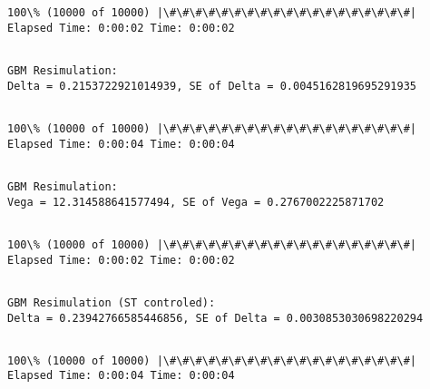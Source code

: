 \documentclass[11pt]{article}
\begin{document}
    \begin{Verbatim}[commandchars=\\\{\}]
100\% (10000 of 10000) |\#\#\#\#\#\#\#\#\#\#\#\#\#\#\#\#\#\#\#| Elapsed Time: 0:00:02 Time: 0:00:02

    \end{Verbatim}

    \begin{Verbatim}[commandchars=\\\{\}]

GBM Resimulation:
Delta = 0.2153722921014939, SE of Delta = 0.0045162819695291935


    \end{Verbatim}

    \begin{Verbatim}[commandchars=\\\{\}]
100\% (10000 of 10000) |\#\#\#\#\#\#\#\#\#\#\#\#\#\#\#\#\#\#\#| Elapsed Time: 0:00:04 Time: 0:00:04

    \end{Verbatim}

    \begin{Verbatim}[commandchars=\\\{\}]

GBM Resimulation:
Vega = 12.314588641577494, SE of Vega = 0.2767002225871702


    \end{Verbatim}

    \begin{Verbatim}[commandchars=\\\{\}]
100\% (10000 of 10000) |\#\#\#\#\#\#\#\#\#\#\#\#\#\#\#\#\#\#\#| Elapsed Time: 0:00:02 Time: 0:00:02

    \end{Verbatim}

    \begin{Verbatim}[commandchars=\\\{\}]

GBM Resimulation (ST controled):
Delta = 0.23942766585446856, SE of Delta = 0.0030853030698220294


    \end{Verbatim}

    \begin{Verbatim}[commandchars=\\\{\}]
100\% (10000 of 10000) |\#\#\#\#\#\#\#\#\#\#\#\#\#\#\#\#\#\#\#| Elapsed Time: 0:00:04 Time: 0:00:04

    \end{Verbatim}
\end{document}
